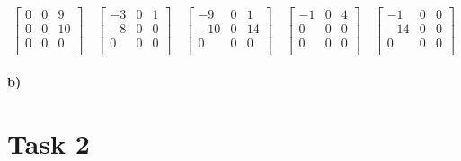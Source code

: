 \documentclass{article}
\begin{document}
		\[
		\begin{bmatrix}
			0 & 0 & 9 \\
			0 & 0 & 10 \\
			0 & 0 & 0 \\
		\end{bmatrix}
		\quad
		\begin{bmatrix}
			-3 & 0 & 1 \\
			-8 & 0 & 0 \\
			 0 & 0 & 0 \\
		\end{bmatrix}
		\quad
		\begin{bmatrix}
			 -9 & 0 & 1 \\
			-10 & 0 & 14 \\
			  0 & 0 & 0 \\
		\end{bmatrix}
		\quad
		\begin{bmatrix}
			-1 & 0 & 4 \\
			 0 & 0 & 0 \\
			 0 & 0 & 0 \\
		\end{bmatrix}
		\quad
		\begin{bmatrix}
			 -1 & 0 & 0 \\
			-14 & 0 & 0 \\
			  0 & 0 & 0 \\
		\end{bmatrix}
		\]
	
	
	
		\paragraph{b)}
	
	\section*{Task 2}

	
\end{document}
